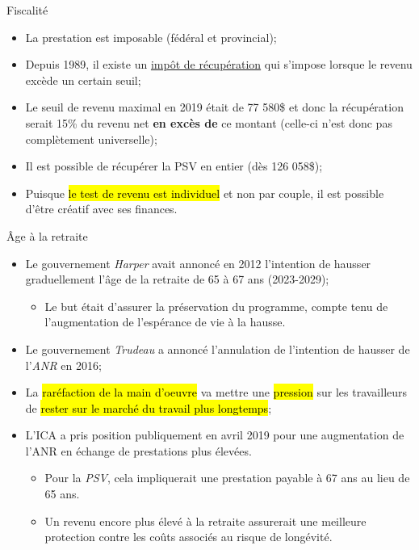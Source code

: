 \documentclass[10pt, french]{article}
\begin{document}
\begin{multicols*}{3}
\begin{conceptgen}{Fiscalité}
\begin{itemize}[leftmargin = *]
	\item	La prestation est imposable (\textcolor{bulgarianrose}{fédéral} et \textcolor{blue(pigment)}{provincial});
	\item	Depuis 1989, il existe un \hypertarget{recup_tx_explain}{\hyperlink{recup_tx_l8r1}{\textcolor{blue_rectangle}{impôt de récupération}}} qui s'impose lorsque le revenu excède un certain seuil;
	\item	Le seuil de revenu maximal en 2019 était de 77 580\$ et donc la récupération serait 15\% du revenu net \textbf{en excès de} ce montant (celle-ci n'est donc pas complètement universelle);
	\item	Il est possible de récupérer la PSV en entier (dès 126 058\$);
	\item	Puisque \hl{le test de revenu est individuel} et non par couple, il est possible d'être créatif avec ses finances.
\end{itemize}
\end{conceptgen}

\begin{conceptgen}{Âge à la retraite}
	\begin{itemize}[leftmargin = *]
		\item	Le gouvernement \textit{Harper} avait annoncé en 2012 l'intention de hausser graduellement l'âge de la retraite de 65 à 67 ans (2023-2029);
				\begin{itemize}[leftmargin = *]
				\item Le but était d'assurer la préservation du programme, compte tenu de l'augmentation de l'espérance de vie à la hausse.
				\end{itemize}
		\item	Le gouvernement \textit{Trudeau} a annoncé l'annulation de l'intention de hausser de l'\textit{ANR} en 2016;
		\item	La \hl{raréfaction de la main d'oeuvre} va mettre une \hl{pression} sur les travailleurs de \hl{rester sur le marché du travail plus longtemps};
		\item	L'ICA a pris position publiquement en avril 2019 pour une augmentation de l'ANR en échange de prestations plus élevées.
				\begin{itemize}[leftmargin = *]
				\item Pour la \textit{PSV}, cela impliquerait une prestation payable à 67 ans au lieu de 65 ans.
				\item Un revenu encore plus élevé à la retraite assurerait une meilleure protection contre les coûts associés au risque de longévité.
				\end{itemize}
	\end{itemize}
\end{conceptgen}


\end{multicols*}
\end{document}
